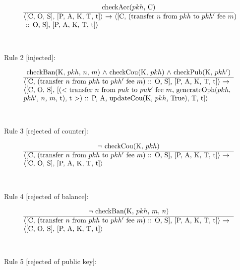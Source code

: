\documentclass[a4paper]{llncs}
\begin{document}
\begin{equation}{}
\frac{\text{checkAcc($pkh$, C)}}{\parbox{4.2in}{\text{$\langle$[C, O, S], [P, A, K, T, t]$\rangle$ $\rightarrow$ $\langle$[C, (transfer $n$ from $pkh$ to $pkh'$ fee $m$)} \\\text{ :: O, S], [P, A, K, T, t]$\rangle$}}} 
\end{equation}
\\
\\
Rule 2 [injected]:

\begin{equation}{}
\frac{\text{checkBan(K, $pkh$, $n$, $m$) $\wedge$ checkCou(K, $pkh$) $\wedge$ checkPub(K, $pkh'$)}}{\parbox{4.2in}{\text{$\langle$[C, (transfer $n$ from $pkh$ to $pkh'$ fee $m$) :: O, S], [P, A, K, T, t]$\rangle$ $\rightarrow$}\\
\text{$\langle$[C, O, S], [($<$ transfer $n$ from $puk$ to $puk'$ fee $m$, generateOph($pkh$, }\\
\text{$pkh'$, $n$, $m$, t), t $>$) :: P, A, updateCou(K, $pkh$, True), T, t]$\rangle$}}} 
\end{equation}
\\
\\
Rule 3 [rejected of counter]:

\begin{equation}{}
\frac{\text{$\neg$ checkCou(K, $pkh$)}}{\parbox{4.2in}{\text{$\langle$[C, (transfer $n$ from $pkh$ to $pkh'$ fee $m$) :: O, S], [P, A, K, T, t]$\rangle$ $\rightarrow$ }\\
\text{$\langle$[C, O, S], [P, A, K, T, t]$\rangle$}}} 
\end{equation}
\\
\\
Rule 4 [rejected of balance]:

\begin{equation}{}
\frac{\text{$\neg$ checkBan(K, $pkh$, $m$, $n$)}}{\parbox{4.2in}{\text{$\langle$[C, (transfer $n$ from $pkh$ to $pkh'$ fee $m$) :: O, S], [P, A, K, T, t]$\rangle$ $\rightarrow$ }\\
\text{$\langle$[C, O, S], [P, A, K, T, t]$\rangle$}}} 
\end{equation}
\\
\\
Rule 5 [rejected of public key]:
\end{document}
